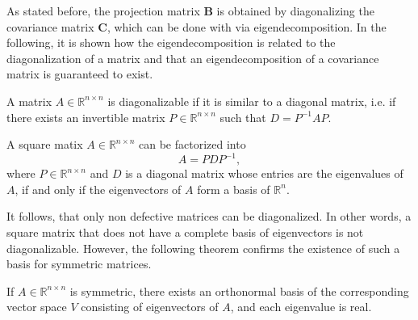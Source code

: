 \documentclass[../../../main.tex]{subfiles}
\begin{document}

As stated before, the projection matrix $\bm{B}$ is obtained by diagonalizing the covariance matrix $\bm{C}$, which can be done with via eigendecomposition. In the following, it is shown how the eigendecomposition is related to the diagonalization of a matrix and that an eigendecomposition of a covariance matrix is guaranteed to exist.

\begin{theorem} \cite[p.98]{dei_2020}
A matrix $A \in \mathbb{R}^{n \times n}$ is diagonalizable if it is similar to a diagonal matrix, i.e. if there exists an invertible matrix $P \in \mathbb{R}^{n \times n}$ such that $D = P^{-1}AP$.
\end{theorem}

\begin{theorem}[Eigendecomposition]\label{th:eigendecomposition} \cite[p.99]{dei_2020}
A square matix $A \in \mathbb{R}^{n \times n}$ can be factorized into
\begin{equation*}
    A = PDP^{-1},
\end{equation*}
where $P \in \mathbb{R}^{n \times n}$ and $D$ is a diagonal matrix whose entries are the eigenvalues of $A$, if and only if the eigenvectors of $A$ form a basis of $\mathbb{R}^n$.
\end{theorem}

It follows, that only non defective matrices can be diagonalized. In other words, a square matrix that does not have a complete basis of eigenvectors is not diagonalizable. However, the following theorem confirms the existence of such a basis for symmetric matrices.

\begin{theorem} \cite[p.94]{dei_2020}
If $A \in \mathbb{R}^{n \times n}$ is symmetric, there exists an orthonormal basis of the corresponding vector space $V$ consisting of eigenvectors of $A$, and each eigenvalue is real.
\end{theorem}
\end{document}
